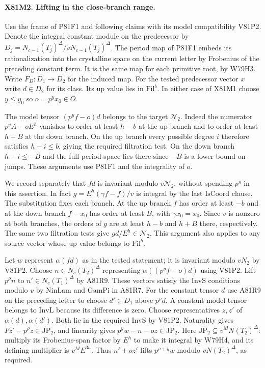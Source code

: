 \paragraph{X81M2. Lifting in the close-branch range.}
Use the frame of P81F1 and following claims with its model
compatibility V81P2. Denote the integral constant module on
the predecessor by $D_j=N_{c-1}(T_j)^\Delta/vN_{c-1}(T_j)^\Delta$.
The period map of P81F1 embeds its rationalization into the
crystalline space on the current letter by Frobenius of the
preceding constant term. It is the same map for each primitive
root, by W79H3. Write $F_D:D_1\to D_2$ for the induced map.
For the tested predecessor vector $x$ write $d\in D_2$ for its
class. Its up value lies in $\mathrm{Fil}^{b}$. In either case
of X81M1 choose $y\le y_0$ so $o=p^y x_0\in O$.

The model tensor $(p^yf-o)d$ belongs to the target $\mathcal N_2$.
Indeed the numerator $p^y A-oE^h$ vanishes to order at least
$h-b$ at the up branch and to order at least $h+B$ at the down
branch. On the up branch every possible degree $i$ therefore
satisfies $h-i\le b$, giving the required filtration test. On the
down branch $h-i\le-B$ and the full period space lies there
since $-B$ is a lower bound on jumps. These arguments use P81F1
and the integrality of $o$.

We record separately that $fd$ is invariant modulo $v\mathcal N_2$,
without spending $p^y$ in this assertion. In fact
$g=E^h(\gamma f-f)/v$ is integral by the last $\mathrm{IsCoord}$
clause. The substitution fixes each branch. At the up branch
$f$ has order at least $-b$ and at the down branch $f-x_0$ has
order at least $B$, with $\gamma x_0=x_0$. Since $v$ is nonzero
at both branches, the orders of $g$ are at least $h-b$ and $h+B$
there, respectively. The same two filtration tests give
$gd/E^h\in\mathcal N_2$. This argument also applies to any
source vector whose up value belongs to $\mathrm{Fil}^b$.

Let $w$ represent $\alpha(fd)$ as in the tested statement; it is
invariant modulo $vN_2$ by V81P2. Choose
$n\in N_c(T_2)^\Delta$ representing $\alpha((p^yf-o)d)$ using
V81P2. Lift $p^\rho n$ to $n'\in N_c(T_1)^\Delta$ by A81R9.
These vectors satisfy the $\mathrm{InvS}$ conditions modulo $v$
by $\mathrm{NinLam}$ and $\mathrm{GamPi}$ in A81R7.
For the constant tensor $d$ use A81R9 on the preceding letter
to choose $d'\in D_1$ above $p^\rho d$. A constant model tensor
belongs to $\mathrm{InvL}$ because its difference is zero.
Choose representatives $z,z'$ of $\alpha(d),\alpha(d')$.
Both lie in the required $\mathrm{InvS}$ by V81P2.
Naturality gives $Fz'-p^\rho z\in\mathrm{JP}_2$, and linearity
gives $p^y w-n-oz\in\mathrm{JP}_2$. Here
$\mathrm{JP}_2\subseteq v^M N(T_2)^\Delta$: multiply its
Frobenius-span factor by $E^h$ to make it integral by W79H4,
and its defining multiplier is $v^ME^{3h}$. Thus
$n'+oz'$ lifts $p^{\rho+y}w$ modulo $vN(T_2)^\Delta$, as required.

